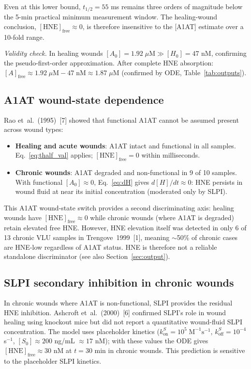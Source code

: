 \documentclass[10pt,a4paper]{article}
\numberwithin{equation}{section}
\newcommand{\kon}{k_{\text{on}}}
\newcommand{\koff}{k_{\text{off}}}
\newcommand{\Mms}{\text{M}^{-1}\text{s}^{-1}}
\newcommand{\cit}[1]{[#1]}   %
\begin{document}
Even at this lower bound, $t_{1/2} = 55$ ms remains three orders of magnitude below
the 5-min practical minimum measurement window. The healing-wound conclusion,
$[\text{HNE}]_{\text{free}} \approx 0$, is therefore insensitive to the [A1AT]
estimate over a 10-fold range.

\textit{Validity check.} In healing wounds $[A_0] = 1.92\;\mu\text{M} \gg [H_0] = 47$ nM,
confirming the pseudo-first-order approximation. After complete HNE absorption:
$[A]_{\text{free}} \approx 1.92\;\mu\text{M} - 47\;\text{nM} \approx 1.87\;\mu\text{M}$
(confirmed by ODE, Table~\ref{tab:outputs}).

\subsection{A1AT wound-state dependence}

Rao et~al.\ (1995)~\cit{7} showed that functional A1AT cannot be assumed present
across wound types:

\begin{itemize}[noitemsep]
  \item \textbf{Healing and acute wounds}: A1AT intact and functional in all samples.
    Eq.~\eqref{eq:thalf_val} applies; $[\text{HNE}]_{\text{free}} = 0$ within milliseconds.
  \item \textbf{Chronic wounds}: A1AT degraded and non-functional in 9 of 10 samples.
    With functional $[A_0] \approx 0$, Eq.~\eqref{eq:dH} gives $d[H]/dt \approx 0$:
    HNE persists in wound fluid at near its initial concentration (moderated only by SLPI).
\end{itemize}

This A1AT wound-state switch provides a second discriminating axis: healing wounds have
$[\text{HNE}]_{\text{free}} \approx 0$ while chronic wounds (where A1AT is degraded)
retain elevated free HNE. However, HNE elevation itself was detected in only 6 of 13
chronic VLU samples in Trengove~1999~\cit{1}, meaning $\sim$50\% of chronic cases are
HNE-low regardless of A1AT status. HNE is therefore not a reliable standalone
discriminator (see also Section~\ref{sec:output}).

\subsection{SLPI secondary inhibition in chronic wounds}

In chronic wounds where A1AT is non-functional, SLPI provides the residual HNE
inhibition. Ashcroft et~al.\ (2000)~\cit{6} confirmed SLPI's role in wound healing
using knockout mice but did not report a quantitative wound-fluid SLPI concentration.
The model uses placeholder kinetics ($\kon^S = 10^5\;\Mms$, $\koff^S = 10^{-4}$ s$^{-1}$,
$[S_0] \approx 200$ ng/mL $\approx 17$ nM); with these values the ODE gives
$[\text{HNE}]_{\text{free}} \approx 30$ nM at $t = 30$ min in chronic wounds.
This prediction is sensitive to the placeholder SLPI kinetics.
\end{document}
